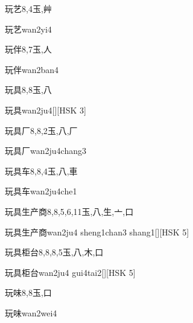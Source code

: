 \begin{Entry}{玩艺}{8,4}{⽟,⾋}
  \begin{Phonetics}{玩艺}{wan2yi4}
  \end{Phonetics}
\end{Entry}

\begin{Entry}{玩伴}{8,7}{⽟,⼈}
  \begin{Phonetics}{玩伴}{wan2ban4}
  \end{Phonetics}
\end{Entry}

\begin{Entry}{玩具}{8,8}{⽟,⼋}
  \begin{Phonetics}{玩具}{wan2ju4}[][HSK 3]
  \end{Phonetics}
\end{Entry}

\begin{Entry}{玩具厂}{8,8,2}{⽟,⼋,⼚}
  \begin{Phonetics}{玩具厂}{wan2ju4chang3}
  \end{Phonetics}
\end{Entry}

\begin{Entry}{玩具车}{8,8,4}{⽟,⼋,⾞}
  \begin{Phonetics}{玩具车}{wan2ju4che1}
  \end{Phonetics}
\end{Entry}

\begin{Entry}{玩具生产商}{8,8,5,6,11}{⽟,⼋,⽣,⼇,⼝}
  \begin{Phonetics}{玩具生产商}{wan2ju4 sheng1chan3 shang1}[][HSK 5]
  \end{Phonetics}
\end{Entry}

\begin{Entry}{玩具柜台}{8,8,8,5}{⽟,⼋,⽊,⼝}
  \begin{Phonetics}{玩具柜台}{wan2ju4 gui4tai2}[][HSK 5]
  \end{Phonetics}
\end{Entry}

\begin{Entry}{玩味}{8,8}{⽟,⼝}
  \begin{Phonetics}{玩味}{wan2wei4}
  \end{Phonetics}
\end{Entry}

